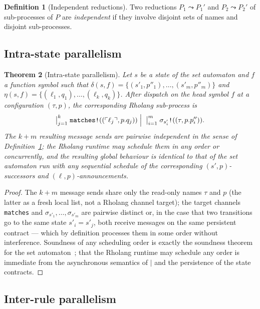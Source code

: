 \documentclass[11pt]{article}
\theoremstyle{plain}
\newtheorem{theorem}{Theorem}[section]
\theoremstyle{definition}
\newtheorem{definition}[theorem]{Definition}
\theoremstyle{remark}
\newcommand{\reflect}[1]{\ulcorner #1 \urcorner}
\newcommand{\rew}{\leadsto}
\begin{document}
\begin{definition}[Independent reductions]\label{def:independent}
Two reductions $P_1 \rew P_1'$ and $P_2 \rew P_2'$ of sub-processes of
$P$ are \emph{independent} if they involve disjoint sets of names and
disjoint sub-processes.
\end{definition}

\subsection{Intra-state parallelism}

\begin{theorem}[Intra-state parallelism]\label{thm:intra}
Let $s$ be a state of the set automaton and $f$ a function symbol such
that $\delta(s, f) = \{(s'_1, p''_1), \ldots, (s'_m, p''_m)\}$ and
$\eta(s, f) = \{(\ell_1, q_1), \ldots, (\ell_k, q_k)\}$. After dispatch
on the head symbol $f$ at a configuration $(\tau, p)$, the corresponding
Rholang sub-process is
\[
  \bigm|_{j=1}^{k} \texttt{matches!}((\reflect{\ell_j}, p.q_j))
  \;\mathbin{\Big|}\;
  \bigm|_{i=1}^{m} \texttt{$\sigma_{s'_i}$!}((\tau, p.p''_i)).
\]
The $k + m$ resulting message sends are pairwise independent in the sense
of Definition~\ref{def:independent}; the Rholang runtime may schedule
them in any order or concurrently, and the resulting global behaviour is
identical to that of the set automaton run with any sequential schedule
of the corresponding $(s', p)$-successors and $(\ell, p)$-announcements.
\end{theorem}

\begin{proof}
The $k + m$ message sends share only the read-only names $\tau$ and $p$
(the latter as a fresh local list, not a Rholang channel target); the
target channels \texttt{matches} and $\sigma_{s'_1}, \ldots, \sigma_{s'_m}$
are pairwise distinct or, in the case that two transitions go to the
same state $s'_i = s'_j$, both receive messages on the same persistent
contract --- which by definition processes them in some order without
interference. Soundness of any scheduling order is exactly the
soundness theorem for the set automaton~\cite[Theorem~6.1]{ErkensGroote2021};
that the Rholang runtime may schedule any order is immediate from the
asynchronous semantics of $\mid$ and the persistence of the state
contracts.
\end{proof}

\subsection{Inter-rule parallelism}
\end{document}
